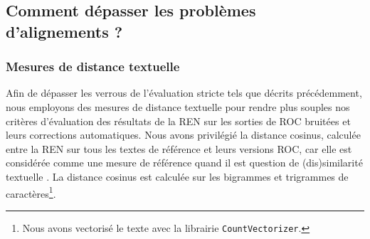\subsection{Comment dépasser les problèmes d'alignements ? }
\label{subsec:ditances_creux_COR-OCR-IMPACT-NER}
\subsubsection{Mesures de distance textuelle}

Afin de dépasser les verrous de l'évaluation stricte tels que décrits précédemment, nous employons des mesures de distance textuelle pour rendre plus souples nos critères d'évaluation des résultats de la REN sur les sorties de ROC bruitées et leurs corrections automatiques. Nous avons privilégié la distance
cosinus, calculée entre la REN sur tous les textes de référence et leurs versions ROC, car elle est considérée comme une mesure de référence quand il est question de (dis)similarité textuelle \cite{buscaldi2020calcul}. La distance cosinus est calculée sur les bigrammes et trigrammes de caractères\footnote{Nous avons vectorisé le texte avec la librairie \texttt{CountVectorizer}.}. 
